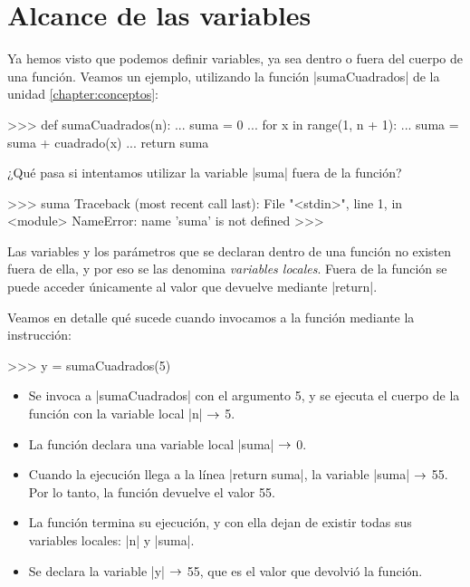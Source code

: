 \section{Alcance de las variables}

Ya hemos visto que podemos definir variables, ya sea dentro o fuera del cuerpo
de una función. Veamos un ejemplo, utilizando la función |sumaCuadrados| de la
unidad \ref{chapter:conceptos}:

\begin{codigo-python-sn}
>>> def sumaCuadrados(n):
...    suma = 0
...    for x in range(1, n + 1):
...        suma = suma + cuadrado(x)
...    return suma
\end{codigo-python-sn}

¿Qué pasa si intentamos utilizar la variable |suma| fuera de la función?

\begin{codigo-python-sn}
>>> suma
Traceback (most recent call last):
  File "<stdin>", line 1, in <module>
NameError: name 'suma' is not defined
>>>
\end{codigo-python-sn}

\begin{observacion}
Las variables y los parámetros que se declaran dentro de una función no existen
fuera de ella, y por eso se las denomina {\it variables locales}. Fuera de la
función se puede acceder únicamente al valor que devuelve mediante |return|.
\end{observacion}

Veamos en detalle qué sucede cuando invocamos a la función mediante la
instrucción:

\begin{codigo-python-sn}
>>> y = sumaCuadrados(5)
\end{codigo-python-sn}

\begin{itemize}
\item Se invoca a |sumaCuadrados| con el argumento 5, y se ejecuta
    el cuerpo de la función con la variable local |n| $\rightarrow$ 5.
\item La función declara una variable local |suma| $\rightarrow$ 0.
\item Cuando la ejecución llega a la línea |return suma|, la variable |suma|
    $\rightarrow$ 55. Por lo tanto, la función devuelve el valor 55.
\item La función termina su ejecución, y con ella dejan de existir todas sus
    variables locales: |n| y |suma|.
\item Se declara la variable |y| $\rightarrow$ 55, que es el valor que devolvió la
    función.
\end{itemize}

